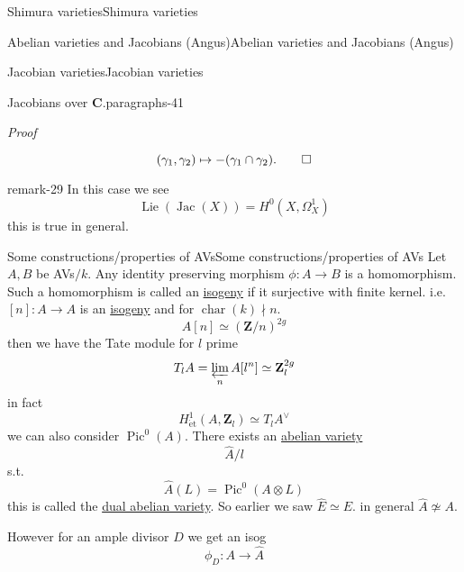 \documentclass[10pt,]{book}
\makeatletter
\renewcommand*{\proofname}{Proof}
\renewenvironment{proof}[1][\proofname]{\par
  \pushQED{\qed}%
  \normalfont \topsep6\p@\@plus6\p@\relax
  \trivlist
  \item\relax
    {\itshape
    #1\@addpunct{.}}\hspace\labelsep\ignorespaces
}{%
  \popQED\endtrivlist\@endpefalse
}
\numberwithin{equation}{section}
\newcommand{\Lie}{\operatorname{Lie}}
\newcommand{\lb}{[}
\newcommand{\rb}{]}
\newcommand{\ZZ}{\mathbf{Z}}
\newcommand{\CC}{\mathbf{C}}
\newcommand{\et}{\mathrm{\acute{e}t}}
\DeclareMathOperator{\Pic}{Pic}
\DeclareMathOperator{\Jac}{Jac}
\DeclareMathOperator{\characteristic}{char}
\makeatother
\begin{document}
\begin{chapterptx}{Shimura varieties}{}{Shimura varieties}{}{}
\begin{sectionptx}{Abelian varieties and Jacobians (Angus)}{}{Abelian varieties and Jacobians (Angus)}{}{}
\begin{subsectionptx}{Jacobian varieties}{}{Jacobian varieties}{}{}
\begin{paragraphs}{Jacobians over \(\CC\).}{paragraphs-41}
\begin{proof}
\begin{equation*}
(\gamma_1, \gamma_2) \mapsto -(\gamma_1\cap \gamma_2)\text{.}\qedhere
\end{equation*}
%
\end{proof}
\begin{remark}{}{remark-29}%
\hypertarget{p-1109}{}%
In this case we see%
\begin{equation*}
\Lie(\Jac(X)) = H^0(X, \Omega_X^1)
\end{equation*}
this is true in general.%
\end{remark}
\end{paragraphs}%
\end{subsectionptx}
%
%
\typeout{************************************************}
\typeout{************************************************}
%
\begin{subsectionptx}{Some constructions/properties of AVs}{}{Some constructions/properties of AVs}{}{}\label{subsection-81}
\hypertarget{p-1110}{}%
Let \(A,B\) be AVs\(/k\). Any identity preserving morphism \(\phi \colon A \to B\) is a homomorphism. Such a homomorphism is called an \hyperref[def-supersing-isog-isog]{isogeny} if it surjective with finite kernel. i.e. \(\lb n \rb \colon A \to A\) is an \hyperref[def-supersing-isog-isog]{isogeny} and for \(\characteristic(k) \nmid n\).%
\begin{equation*}
A[n] \simeq (\ZZ/n)^{2g}
\end{equation*}
then we have the Tate module for \(l\) prime%
\begin{equation*}
T_lA = \varprojlim_n A[l^n] \simeq \ZZ_l^{2g}
\end{equation*}
in fact%
\begin{equation*}
H^1_{\et} (A, \ZZ_l) \simeq T_lA ^\vee
\end{equation*}
we can also consider \(\Pic^0(A)\). There exists an \hyperref[def-buntes-abvar]{abelian variety}%
\begin{equation*}
\hat A/l
\end{equation*}
s.t.%
\begin{equation*}
\hat A (L) = \Pic^0(A \otimes L)
\end{equation*}
this is called the \hyperref[def-dual-abvar]{dual abelian variety}. So earlier we saw \(\hat E \simeq E\). in general \(\hat A \not \simeq  A\).%
\par
\hypertarget{p-1111}{}%
However for an ample divisor \(D\) we get an isog%
\begin{equation*}
\phi_D \colon A \to \hat A
\end{equation*}

\end{subsectionptx}
\end{sectionptx}
\end{chapterptx}
\end{document}

